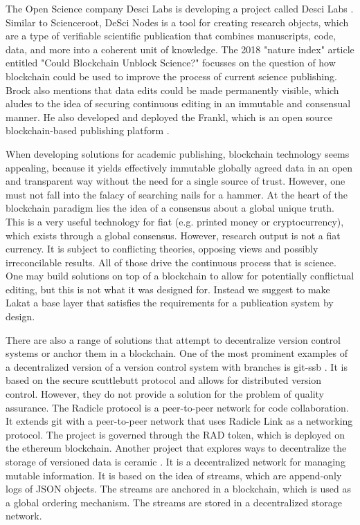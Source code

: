 \documentclass[14pt]{article}
\begin{document}
The Open Science company Desci Labs is developing a project called Desci Labs \cite{descilabs}. Similar to Scienceroot, DeSci Nodes is a tool for creating research objects, which are a type of verifiable scientific publication that combines manuscripts, code, data, and more into a coherent unit of knowledge.  
The 2018 "nature index" article \cite{brock2018} entitled "Could Blockchain Unblock Science?" focusses on the question of how blockchain could be used to improve the process of current science publishing. Brock also mentions that data edits could be made permanently visible, which aludes to the idea of securing continuous editing in an immutable and consensual manner. He also developed and deployed the Frankl, which is an open source blockchain-based publishing platform \cite{brockopenscience2018}. 

When developing solutions for academic publishing, blockchain technology seems appealing, because it yields effectively immutable globally agreed data in an open and transparent way without the need for a single source of trust. However, one must not fall into the falacy of searching nails for a hammer. At the heart of the blockchain paradigm lies the idea of a consensus about a global unique truth. This is a very useful technology for fiat (e.g. printed money or cryptocurrency), which exists through a global consensus. However, research output is not a fiat currency. It is subject to conflicting theories, opposing views and possibly irreconcilable results. All of those drive the continuous process that is science. One may build solutions on top of a blockchain to allow for potentially conflictual editing, but this is not what it was designed for. Instead we suggest to make Lakat a base layer that satisfies the requirements for a publication system by design.
   
There are also a range of solutions that attempt to decentralize version control systems or anchor them in a blockchain. One of the most prominent examples of a decentralized version of a version control system with branches is git-ssb \cite{gitssb}. It is based on the secure scuttlebutt protocol \cite{scuttlebutt} and allows for distributed version control. However, they do not provide a solution for the problem of quality assurance.
The Radicle protocol \cite{radicle} is a peer-to-peer network for code collaboration. It extends git with a peer-to-peer network that uses Radicle Link as a networking protocol. The project is governed through the RAD token, which is deployed on the ethereum blockchain. Another project that explores ways to decentralize the storage of versioned data is ceramic \cite{ceramic}. It is a decentralized network for managing mutable information. It is based on the idea of streams, which are append-only logs of JSON objects. The streams are anchored in a blockchain, which is used as a global ordering mechanism. The streams are stored in a decentralized storage network.  
\end{document}

